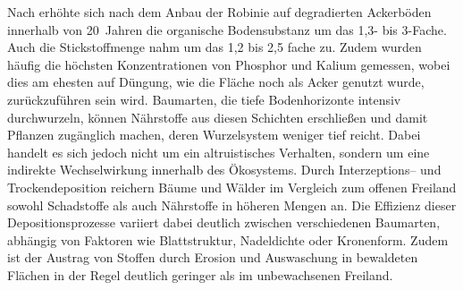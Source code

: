 \documentclass[twocolumn]{scrartcl}
\begin{document}
Nach \citet{papaioannou2016robinieBoden} erhöhte sich nach dem Anbau
der Robinie auf degradierten Ackerböden innerhalb von 20~Jahren die
organische Bodensubstanz um das 1,3- bis 3-Fache. Auch die
Stickstoffmenge nahm um das 1,2 bis 2,5 fache zu. Zudem wurden häufig
die höchsten Konzentrationen von Phosphor und Kalium gemessen, wobei
dies am ehesten auf Düngung, wie die Fläche noch als Acker genutzt
wurde, zurückzuführen sein wird. Baumarten, die tiefe Bodenhorizonte
intensiv durchwurzeln, können Nährstoffe aus diesen Schichten
erschließen und damit Pflanzen zugänglich machen, deren Wurzelsystem
weniger tief reicht. Dabei handelt es sich jedoch nicht um ein
altruistisches Verhalten, sondern um eine indirekte Wechselwirkung
innerhalb des Ökosystems. Durch Interzeptions-- und Trockendeposition
reichern Bäume und Wälder im Vergleich zum offenen Freiland sowohl
Schadstoffe als auch Nährstoffe in höheren Mengen an. Die Effizienz
dieser Depositionsprozesse variiert dabei deutlich zwischen
verschiedenen Baumarten, abhängig von Faktoren wie Blattstruktur,
Nadeldichte oder Kronenform. Zudem ist der Austrag von Stoffen durch
Erosion und Auswaschung in bewaldeten Flächen in der Regel deutlich
geringer als im unbewachsenen Freiland.
\end{document}
